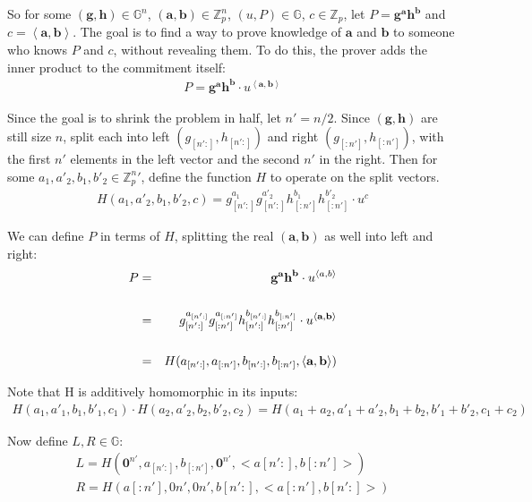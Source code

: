 \documentclass{article}
\begin{document}
So for some $(\textbf{g}, \textbf{h}) \in \mathbb{G}^n$, $(\textbf{a}, \textbf{b}) \in \mathbb{Z}_p^n$, $(u, P) \in \mathbb{G}$, $c \in \mathbb{Z}_p$, let $P = \textbf{g}^\textbf{a} \textbf{h}^\textbf{b}$ and $c = \left<\textbf{a}, \textbf{b}\right>$.  The goal is to find a way to prove knowledge of $\textbf{a}$ and $\textbf{b}$ to someone who knows $P$ and $c$, without revealing them.  To do this, the prover adds the inner product to the commitment itself:
\begin{eqnarray}
  P = \textbf{g}^\textbf{a} \textbf{h}^\textbf{b} \cdot u^{\left<\textbf{a}, \textbf{b}\right>}
\end{eqnarray}

Since the goal is to shrink the problem in half, let $n' = n/2$.  Since $(\textbf{g}, \textbf{h})$ are still size $n$, split each into left $(g_{[n':]}, h_{[n':]})$ and right $(g_{[:n']}, h_{[:n']})$, with the first $n'$ elements in the left vector and the second $n'$ in the right.  Then for some $a_1, a'_2, b_1, b'_2 \in \mathbb{Z}_p^n'$, define the function $H$ to operate on the split vectors. 
\begin{eqnarray}
  H(a_1, a'_2, b_1, b'_2, c) = g_{[n':]}^{a_1} g_{[n':]}^{a'_2} h_{[:n']}^{b_1} h_{[:n']}^{b'_2} \cdot u^c
\end{eqnarray}

We can define $P$ in terms of $H$, splitting the real $(\textbf{a}, \textbf{b})$ as well into left and right:
\begin{eqnarray}
  P &=& \textbf{g}^{\textbf{a}} \textbf{h}^{\textbf{b}} \cdot u^{\left<a, b\right>}\\
  \cr &=& g_{[n':]}^{a_{[n':]}} g_{[:n']}^{a_{[:n']}} h_{[n':]}^{b_{[n':]}} h_{[:n']}^{b_{[:n']}} \cdot u^{\left<\textbf{a}, \textbf{b}\right>}\\
  \cr &=& H(a_{[n':]}, a_{[:n']}, b_{[n':]}, b_{[:n']}, \left<\textbf{a}, \textbf{b}\right>)
\end{eqnarray}

Note that H is additively homomorphic in its inputs:
\begin{eqnarray}
  H(a_1, a'_1, b_1, b'_1, c_1) \cdot H(a_2, a'_2, b_2, b'_2, c_2) = H(a_1 + a_2, a'_1 + a'_2, b_1 + b_2, b'_1 + b'_2, c_1 + c_2)
\end{eqnarray}

Now define $L, R \in \mathbb{G}$:
\begin{eqnarray}
  L = H(\textbf{0}^{n'}, a_{[n':]}, b_{[:n']}, \textbf{0}^{n'}, <a{[n':]}, b{[:n']}>)\\
  R = H(a{[:n']}, 0n', 0n', b{[n':]}, <a{[:n']}, b{[n':]}>)
\end{eqnarray}
\end{document}
